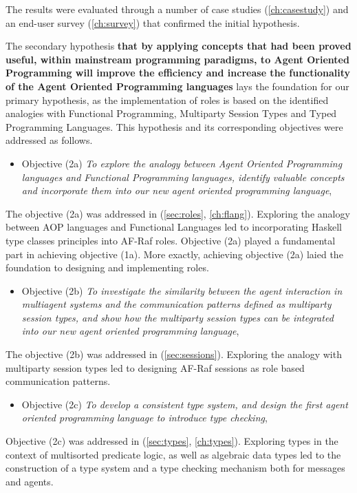 \documentclass[a4paper,12pt,oneside,fleqn]{book} %
\begin{document}
The results were evaluated through a number of case
studies (\autoref{ch:casestudy}) and an end-user
survey (\autoref{ch:survey}) that confirmed the initial hypothesis.

The secondary hypothesis \textbf{that by applying concepts
that had been proved useful, within mainstream programming paradigms, to
Agent Oriented Programming will improve the efficiency and increase
the functionality of the Agent Oriented Programming languages} lays the
foundation for our primary hypothesis, as the implementation of roles is
based on the identified analogies with Functional Programming, Multiparty
Session Types and Typed Programming Languages. This hypothesis and its
corresponding objectives were addressed as follows.

\begin{itemize}
  \item Objective (2a) \textit{To explore the analogy between Agent
    Oriented Programming languages and Functional Programming languages,
    identify valuable concepts and incorporate them into our new agent
  oriented programming language}, 
\end{itemize}
  
The objective (2a) was addressed in (\autoref{sec:roles},
\autoref{ch:flang}). Exploring the analogy between AOP languages and
Functional Languages led to incorporating Haskell type classes principles
into AF-Raf roles. Objective (2a) played a fundamental part in achieving
objective (1a). More exactly, achieving objective (2a) laied the foundation
to designing and implementing roles. 

\begin{itemize}
\item Objective (2b) \textit{To investigate the similarity between
    the agent interaction in multiagent systems and the communication
    patterns defined as multiparty session types, and show how the
    multiparty session types can be integrated into our new agent oriented
  programming language},
\end{itemize}
  
The objective (2b) was addressed in (\autoref{sec:sessions}). Exploring
the analogy with multiparty session types led to designing AF-Raf sessions
as role based communication patterns.

\begin{itemize}
\item Objective (2c) \textit{To develop a consistent type system,
    and design the first agent oriented programming language to introduce
  type checking}, 
  
\end{itemize}
Objective (2c) was addressed in (\autoref{sec:types}, \autoref{ch:types}).
Exploring types in the context of multisorted predicate logic, as well as
algebraic data types led to the construction of a type system and a type
checking mechanism both for messages and agents.
\end{document}
